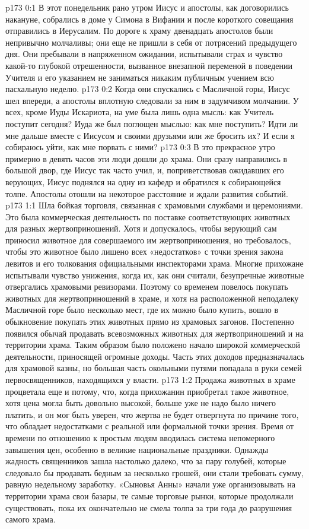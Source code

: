 \vs p173 0:1 В этот понедельник рано утром Иисус и апостолы, как договорились накануне, собрались в доме у Симона в Вифании и после короткого совещания отправились в Иерусалим. По дороге к храму двенадцать апостолов были непривычно молчаливы; они еще не пришли в себя от потрясений предыдущего дня. Они пребывали в напряженном ожидании, испытывали страх и чувство какой\hyp{}то глубокой отрешенности, вызванное внезапной переменой в поведении Учителя и его указанием не заниматься никаким публичным учением всю пасхальную неделю.
\vs p173 0:2 Когда они спускались с Масличной горы, Иисус шел впереди, а апостолы вплотную следовали за ним в задумчивом молчании. У всех, кроме Иуды Искариота, на уме была лишь одна мысль: как Учитель поступит сегодня? Иуда же был поглощен мыслью: как мне поступить? Идти ли мне дальше вместе с Иисусом и своими друзьями или же бросить их? И если я собираюсь уйти, как мне порвать с ними?
\vs p173 0:3 В это прекрасное утро примерно в девять часов эти люди дошли до храма. Они сразу направились в большой двор, где Иисус так часто учил, и, поприветствовав ожидавших его верующих, Иисус поднялся на одну из кафедр и обратился к собирающейся толпе. Апостолы отошли на некоторое расстояние и ждали развития событий.
\vs p173 1:1 Шла бойкая торговля, связанная с храмовыми службами и церемониями. Это была коммерческая деятельность по поставке соответствующих животных для разных жертвоприношений. Хотя и допускалось, чтобы верующий сам приносил животное для совершаемого им жертвоприношения, но требовалось, чтобы это животное было лишено всех «недостатков» с точки зрения закона левитов и его толкования официальными инспекторами храма. Многие прихожане испытывали чувство унижения, когда их, как они считали, безупречные животные отвергались храмовыми ревизорами. Поэтому со временем повелось покупать животных для жертвоприношений в храме, и хотя на расположенной неподалеку Масличной горе было несколько мест, где их можно было купить, вошло в обыкновение покупать этих животных прямо из храмовых загонов. Постепенно появился обычай продавать всевозможных животных для жертвоприношений и на территории храма. Таким образом было положено начало широкой коммерческой деятельности, приносящей огромные доходы. Часть этих доходов предназначалась для храмовой казны, но большая часть окольными путями попадала в руки семей первосвященников, находящихся у власти.
\vs p173 1:2 Продажа животных в храме процветала еще и потому, что, когда прихожанин приобретал такое животное, хотя цена могла быть довольно высокой, больше уже не надо было ничего платить, и он мог быть уверен, что жертва не будет отвергнута по причине того, что обладает недостатками с реальной или формальной точки зрения. Время от времени по отношению к простым людям вводилась система непомерного завышения цен, особенно в великие национальные праздники. Однажды жадность священников зашла настолько далеко, что за пару голубей, которые следовало бы продавать бедным за несколько грошей, они стали требовать сумму, равную недельному заработку. «Сыновья Анны» начали уже организовывать на территории храма свои базары, те самые торговые рынки, которые продолжали существовать, пока их окончательно не смела толпа за три года до разрушения самого храма.
